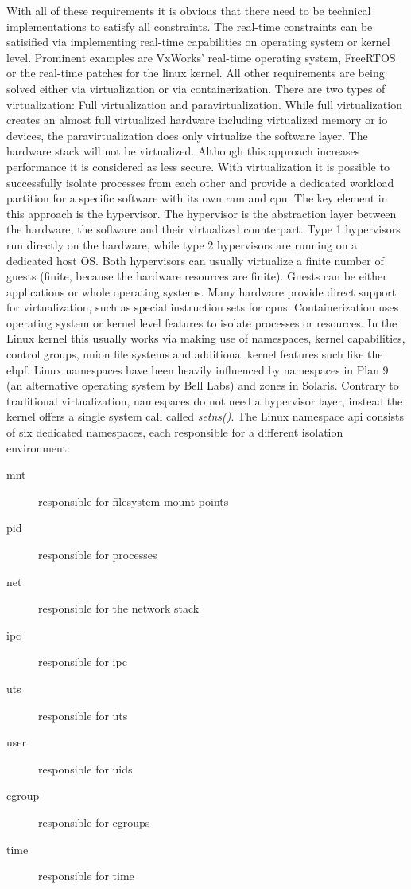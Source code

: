 \documentclass[titlepage]{report}
\begin{document}
With all of these requirements it is obvious that there need to be technical implementations to satisfy all constraints.
The real-time constraints can be satisified via implementing real-time capabilities on operating system or kernel level.
Prominent examples are VxWorks' real-time operating system\cite{vxworks}, FreeRTOS\cite{freertos} or the real-time patches for the linux kernel\cite{realtimelinux}.
All other requirements are being solved either via virtualization or via containerization. There are two types of virtualization: Full virtualization and paravirtualization.
While full virtualization creates an almost full virtualized hardware including virtualized memory or \gls{io} devices, the paravirtualization does only virtualize
the software layer. The hardware stack will not be virtualized. Although this approach increases performance it is considered as less secure. With virtualization
it is possible to successfully isolate processes from each other and provide a dedicated workload partition for a specific software with its own \gls{ram} and \gls{cpu}.
The key element in this approach is the hypervisor. The hypervisor is the abstraction layer between the hardware, the software and their virtualized counterpart. 
Type 1 hypervisors run directly on the hardware, while type 2 hypervisors are running
on a dedicated host OS. Both hypervisors can usually virtualize a finite number of guests (finite, because the hardware resources are finite). Guests can be either applications or whole operating systems.
Many hardware provide direct support for virtualization, such as special instruction sets for \glspl{cpu}.
Containerization uses operating system or kernel level features to isolate processes or resources. In the Linux kernel this usually works via
making use of namespaces, kernel capabilities, control groups, union file systems and additional kernel features such like the \gls{ebpf}. Linux namespaces have been heavily influenced by namespaces in Plan 9 (an alternative
operating system by Bell Labs) and zones in Solaris. Contrary to traditional virtualization, namespaces do not need a hypervisor layer, instead the kernel offers
a single system call called \emph{setns()}\cite{mannamespaces}. The Linux namespace \gls{api} consists of six dedicated namespaces, each responsible for a different isolation environment\cite{namespacelist}:
\begin{description}
    \item[mnt] responsible for filesystem mount points
    \item[pid] responsible for processes
    \item[net] responsible for the network stack
    \item[ipc] responsible for \gls{ipc}
    \item[uts] responsible for \gls{uts}
    \item[user] responsible for \glspl{uid}
    \item[cgroup] responsible for \glspl{cgroup}
    \item[time] responsible for time  
\end{description}
\end{document}
